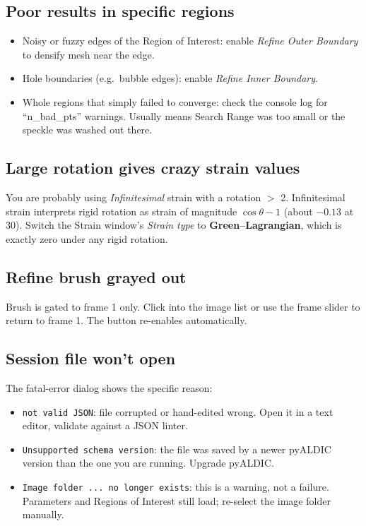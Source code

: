 \subsection{Poor results in specific regions}

\begin{itemize}
  \item Noisy or fuzzy edges of the Region of Interest: enable
        \emph{Refine Outer Boundary} to densify mesh near the edge.
  \item Hole boundaries (e.g.\ bubble edges): enable \emph{Refine
        Inner Boundary}.
  \item Whole regions that simply failed to converge: check the
        console log for ``n\_bad\_pts'' warnings. Usually means
        Search Range was too small or the speckle was washed out
        there.
\end{itemize}

\subsection{Large rotation gives crazy strain values}

You are probably using \emph{Infinitesimal} strain with a rotation
$>$ 2\textdegree. Infinitesimal strain interprets rigid rotation as
strain of magnitude $\cos\theta - 1$ (about $-0.13$ at 30\textdegree).
Switch the Strain window's \emph{Strain type} to
\textbf{Green--Lagrangian}, which is exactly zero under any rigid
rotation.

\subsection{Refine brush grayed out}

Brush is gated to frame 1 only. Click into the image list or use
the frame slider to return to frame 1. The button re-enables
automatically.

\subsection{Session file won't open}

The fatal-error dialog shows the specific reason:
\begin{itemize}
  \item \texttt{not valid JSON}: file corrupted or hand-edited
        wrong. Open it in a text editor, validate against a JSON
        linter.
  \item \texttt{Unsupported schema version}: the file was saved by a
        newer pyALDIC version than the one you are running. Upgrade
        pyALDIC.
  \item \texttt{Image folder ... no longer exists}: this is a
        warning, not a failure. Parameters and Regions of Interest
        still load; re-select the image folder manually.
\end{itemize}
